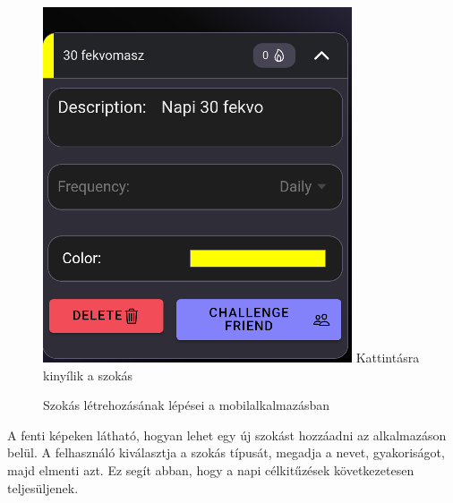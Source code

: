 \documentclass[12pt]{report}
\begin{document}
\begin{figure}[H]
    \vspace{0.8em}

    \hfill
    \begin{minipage}[b]{0.25\textwidth}
        \centering
        \includegraphics[width=\linewidth]{src/habitkinyilt.png}
        Kattintásra kinyílik a szokás
    \end{minipage}

    {Szokás létrehozásának lépései a mobilalkalmazásban}
    \label{fig:habit-creation}
\end{figure}

A fenti képeken látható, hogyan lehet egy új szokást hozzáadni az alkalmazáson belül. A felhasználó kiválasztja a szokás típusát, megadja a nevet, gyakoriságot, majd elmenti azt. Ez segít abban, hogy a napi célkitűzések következetesen teljesüljenek.
\end{document}
